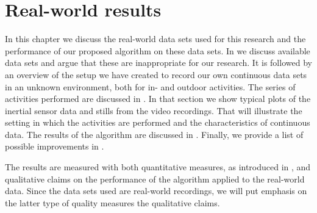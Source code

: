 
\chapter{Real-world results}

\label{Chapter6} %


In this chapter we discuss the real-world data sets used for this research and the performance of our proposed algorithm on these data sets.
In  we discuss available data sets and argue that these are inappropriate for our research.
It is followed by an overview of the setup we have created to record our own continuous data sets in an unknown environment, both for in- and outdoor activities.
The series of activities performed are discussed in .
In that section we show typical plots of the inertial sensor data and stills from the video recordings.
That will illustrate the setting in which the activities are performed and the characteristics of continuous data.
The results of the algorithm are discussed in .
Finally, we provide a list of possible improvements in .

The results are measured with both quantitative measures, as introduced in , and qualitative claims on the performance of the algorithm applied to the real-world data.
Since the data sets used are real-world recordings, we will put emphasis on the latter type of quality measures \ie the qualitative claims.



